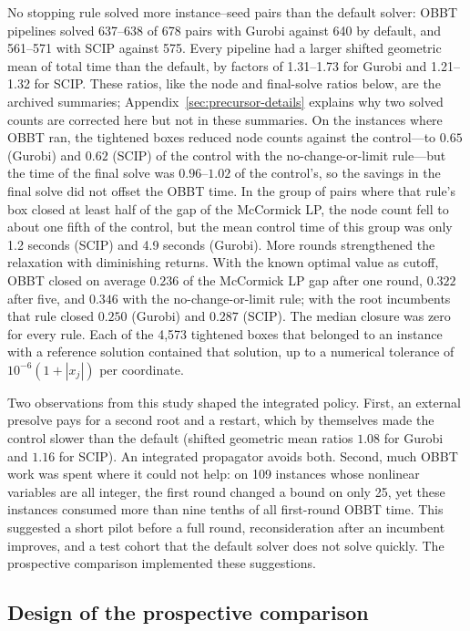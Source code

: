 No stopping rule solved more instance--seed pairs than the default solver:
OBBT pipelines solved 637--638 of 678 pairs with Gurobi against 640 by default,
and 561--571 with SCIP against 575. Every pipeline had a larger shifted
geometric mean of total time than the default, by factors of 1.31--1.73 for
Gurobi and 1.21--1.32 for SCIP. These ratios, like the node and final-solve
ratios below, are the archived summaries; Appendix~\ref{sec:precursor-details}
explains why two solved counts are corrected here but not in these summaries.
On the instances where OBBT ran,
the tightened boxes reduced node counts against the control---to $0.65$
(Gurobi) and $0.62$ (SCIP) of the control with the no-change-or-limit rule---but
the time of the final solve was $0.96$--$1.02$ of the control's, so the savings
in the final solve did not offset the OBBT time. In the group of pairs where
that rule's box closed at least half of the gap of the McCormick LP, the node
count fell to about one fifth of the control, but the mean control time of this
group was only 1.2 seconds (SCIP) and 4.9 seconds (Gurobi). More rounds
strengthened the relaxation
with diminishing returns. With the known optimal value as cutoff, OBBT closed
on average $0.236$ of the McCormick LP gap after one round, $0.322$ after five,
and $0.346$ with the no-change-or-limit rule; with the root incumbents that
rule closed $0.250$ (Gurobi) and $0.287$ (SCIP). The median closure was zero for
every rule. Each of the 4,573 tightened boxes that belonged to an instance with
a reference solution contained that solution, up to a numerical tolerance of
$10^{-6}(1+|x_j|)$ per coordinate.

Two observations from this study shaped the integrated policy. First, an
external presolve pays for a second root and a restart, which by themselves
made the control slower than the default (shifted geometric mean ratios $1.08$
for Gurobi and $1.16$ for SCIP). An integrated propagator avoids both. Second,
much OBBT work was spent where it could not help: on 109 instances whose
nonlinear variables are all integer, the first round changed a bound on only 25,
yet these instances consumed more than nine tenths of all first-round OBBT time.
This suggested a short pilot before a full round, reconsideration after an
incumbent improves, and a test cohort that the default solver does not solve
quickly. The prospective comparison implemented these suggestions.

\subsection{Design of the prospective comparison}\label{sec:experiments-design}


